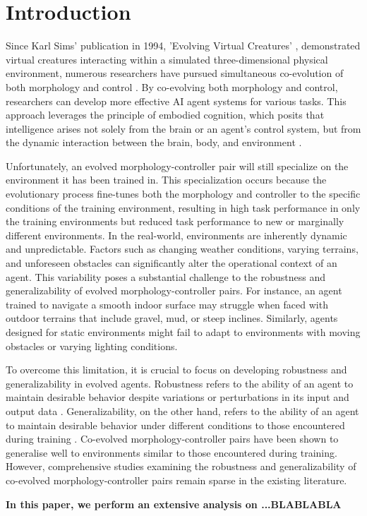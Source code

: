 \section{Introduction}
Since Karl Sims' publication in 1994, 'Evolving Virtual Creatures' \cite{Karl_Sims_1994}, demonstrated virtual creatures interacting within a simulated three-dimensional physical environment, numerous researchers have pursued simultaneous co-evolution of both morphology and control \cite{Nick_Cheney_2017,Emma_Stensby_2021,Joshua_Auerbach_2014,Luis_2024}. By co-evolving both morphology and control, researchers can develop more effective AI agent systems for various tasks. This approach leverages the principle of embodied cognition, which posits that intelligence arises not solely from the brain or an agent's control system, but from the dynamic interaction between the brain, body, and environment \cite{Josh_Bongard_2013}.

Unfortunately, an evolved morphology-controller pair will still specialize on the environment it has been trained in. This specialization occurs because the evolutionary process fine-tunes both the morphology and controller to the specific conditions of the training environment, resulting in high task performance in only the training environments but reduced task performance to new or marginally different environments. In the real-world, environments are inherently dynamic and unpredictable. Factors such as changing weather conditions, varying terrains, and unforeseen obstacles can significantly alter the operational context of an agent. This variability poses a substantial challenge to the robustness and generalizability of evolved morphology-controller pairs. For instance, an agent trained to navigate a smooth indoor surface may struggle when faced with outdoor terrains that include gravel, mud, or steep inclines. Similarly, agents designed for static environments might fail to adapt to environments with moving obstacles or varying lighting conditions.

To overcome this limitation, it is crucial to focus on developing robustness and generalizability in evolved agents. Robustness refers to the ability of an agent to maintain desirable behavior despite variations or perturbations in its input and output data \cite{Ravi_Mangal_2019, Charles_Packer_2019, Xu_Mengdi_2022}. Generalizability, on the other hand, refers to the ability of an agent to maintain desirable behavior under different conditions to those encountered during training \cite{Charles_Packer_2019,Xu_Mengdi_2022}. Co-evolved morphology-controller pairs have been shown to generalise well to environments similar to those encountered during training. However, comprehensive studies examining the robustness and generalizability of co-evolved morphology-controller pairs remain sparse in the existing literature.

\textbf{In this paper, we perform an extensive analysis on ...BLABLABLA}

